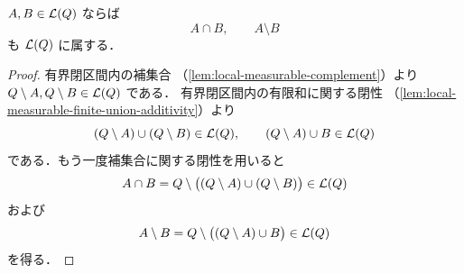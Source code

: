 \begin{corollary}[有界閉区間内の集合演算]\label{cor:local-measurable-set-operations}
$A,B\in\mathcal L(Q)$ ならば
\[
A\cap B,\qquad A\setminus B
\]
も $\mathcal L(Q)$ に属する．
\end{corollary}
\begin{proof}
有界閉区間内の補集合
（\cref{lem:local-measurable-complement}）より $Q\setminus A,Q\setminus B\in\mathcal L(Q)$ である．
有界閉区間内の有限和に関する閉性
（\cref{lem:local-measurable-finite-union-additivity}）より
\[
(Q\setminus A)\cup(Q\setminus B)\in\mathcal L(Q),
\qquad
(Q\setminus A)\cup B\in\mathcal L(Q)
\]
である．もう一度補集合に関する閉性を用いると
\[
A\cap B
=
Q\setminus\bigl((Q\setminus A)\cup(Q\setminus B)\bigr)\in\mathcal L(Q)
\]
および
\[
A\setminus B
=
Q\setminus\bigl((Q\setminus A)\cup B\bigr)\in\mathcal L(Q)
\]
を得る．
\end{proof}

